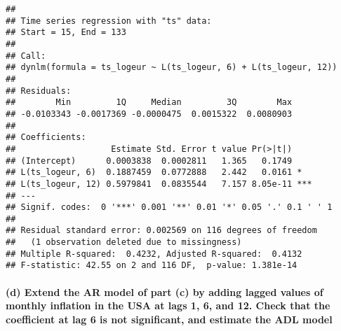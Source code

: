 \documentclass[]{article}
\newenvironment{Shaded}{\begin{snugshade}}{\end{snugshade}}
\newcommand{\DataTypeTok}[1]{\textcolor[rgb]{0.13,0.29,0.53}{#1}}
\newcommand{\DecValTok}[1]{\textcolor[rgb]{0.00,0.00,0.81}{#1}}
\newcommand{\KeywordTok}[1]{\textcolor[rgb]{0.13,0.29,0.53}{\textbf{#1}}}
\newcommand{\NormalTok}[1]{#1}
\newcommand{\OperatorTok}[1]{\textcolor[rgb]{0.81,0.36,0.00}{\textbf{#1}}}
\newcommand{\StringTok}[1]{\textcolor[rgb]{0.31,0.60,0.02}{#1}}
\let\oldparagraph\paragraph
\renewcommand{\paragraph}[1]{\oldparagraph{#1}\mbox{}}
\begin{document}
\begin{Shaded}
\end{Shaded}

\begin{verbatim}
## 
## Time series regression with "ts" data:
## Start = 15, End = 133
## 
## Call:
## dynlm(formula = ts_logeur ~ L(ts_logeur, 6) + L(ts_logeur, 12))
## 
## Residuals:
##        Min         1Q     Median         3Q        Max 
## -0.0103343 -0.0017369 -0.0000475  0.0015322  0.0080903 
## 
## Coefficients:
##                   Estimate Std. Error t value Pr(>|t|)    
## (Intercept)      0.0003838  0.0002811   1.365   0.1749    
## L(ts_logeur, 6)  0.1887459  0.0772888   2.442   0.0161 *  
## L(ts_logeur, 12) 0.5979841  0.0835544   7.157 8.05e-11 ***
## ---
## Signif. codes:  0 '***' 0.001 '**' 0.01 '*' 0.05 '.' 0.1 ' ' 1
## 
## Residual standard error: 0.002569 on 116 degrees of freedom
##   (1 observation deleted due to missingness)
## Multiple R-squared:  0.4232, Adjusted R-squared:  0.4132 
## F-statistic: 42.55 on 2 and 116 DF,  p-value: 1.381e-14
\end{verbatim}

\hypertarget{d-extend-the-ar-model-of-part-c-by-adding-lagged-values-of-monthly-inflation-in-the-usa-at-lags-1-6-and-12.-check-that-the-coefficient-at-lag-6-is-not-significant-and-estimate-the-adl-model}{%
\paragraph{(d) Extend the AR model of part (c) by adding lagged values
of monthly inflation in the USA at lags 1, 6, and 12. Check that the
coefficient at lag 6 is not significant, and estimate the ADL
model}\label{d-extend-the-ar-model-of-part-c-by-adding-lagged-values-of-monthly-inflation-in-the-usa-at-lags-1-6-and-12.-check-that-the-coefficient-at-lag-6-is-not-significant-and-estimate-the-adl-model}}
\end{document}
